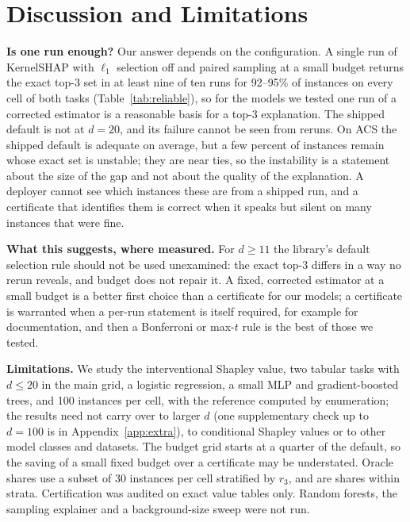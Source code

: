 \section{Discussion and Limitations}
\label{sec:discussion}

\textbf{Is one run enough?}
Our answer depends on the configuration. A single run of KernelSHAP with $\ell_1$ selection off and paired sampling at a small budget returns the exact top-3 set in at least nine of ten runs for 92--95\% of instances on every cell of both tasks (Table~\ref{tab:reliable}), so for the models we tested one run of a corrected estimator is a reasonable basis for a top-3 explanation. The shipped default is not at $d=20$, and its failure cannot be seen from reruns. On ACS the shipped default is adequate on average, but a few percent of instances remain whose exact set is unstable; they are near ties, so the instability is a statement about the size of the gap and not about the quality of the explanation. A deployer cannot see which instances these are from a shipped run, and a certificate that identifies them is correct when it speaks but silent on many instances that were fine.

\textbf{What this suggests, where measured.}
For $d\ge11$ the library's default selection rule should not be used unexamined: the exact top-3 differs in a way no rerun reveals, and budget does not repair it. A fixed, corrected estimator at a small budget is a better first choice than a certificate for our models; a certificate is warranted when a per-run statement is itself required, for example for documentation, and then a Bonferroni or max-$t$ rule is the best of those we tested.

\textbf{Limitations.}
We study the interventional Shapley value, two tabular tasks with $d\le20$ in the main grid, a logistic regression, a small MLP and gradient-boosted trees, and 100 instances per cell, with the reference computed by enumeration; the results need not carry over to larger $d$ (one supplementary check up to $d=100$ is in Appendix~\ref{app:extra}), to conditional Shapley values or to other model classes and datasets. The budget grid starts at a quarter of the default, so the saving of a small fixed budget over a certificate may be understated. Oracle shares use a subset of 30 instances per cell stratified by $r_3$, and are shares within strata. Certification was audited on exact value tables only. Random forests, the sampling explainer and a background-size sweep were not run.
